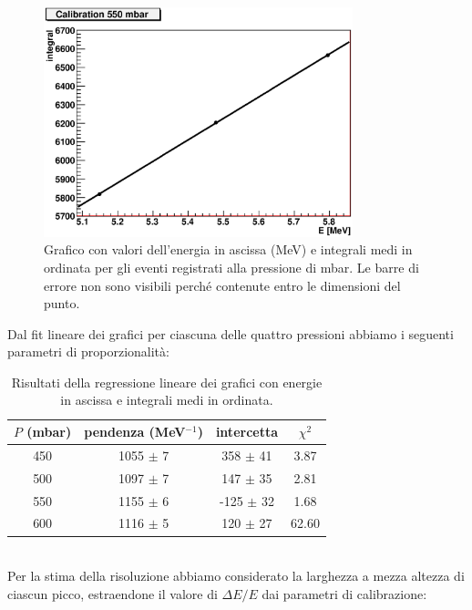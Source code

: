 \documentclass[italian,a4paper]{article}
\newcommand{\D}{\Delta}
\begin{document}
\begin{figure}[h!]\centering
\includegraphics[width=0.8\textwidth]{550_calib.eps}
\caption{Grafico con valori dell'energia in ascissa (MeV) e integrali medi in ordinata per gli eventi registrati alla pressione di \unit[550]{mbar}. Le barre di errore non sono visibili perch\'{e} contenute entro le dimensioni del punto.}
\label{calib}
\end{figure}
\clearpage
Dal fit lineare dei grafici per ciascuna delle quattro pressioni abbiamo i seguenti parametri di proporzionalit\`a:
\begin{table}[h!]\centering
\begin{tabular}{*4c}
$P$ (mbar)&		pendenza (MeV$^{-1}$)&	intercetta&   	$\chi^2$\\\hline
450&			1055 $\pm$ 7&		358 $\pm$ 41&	3.87\\
500&			1097 $\pm$ 7&		147 $\pm$ 35&	2.81\\
550&			1155 $\pm$ 6&		-125 $\pm$ 32&	1.68\\
600&			1116 $\pm$ 5&		120 $\pm$ 27&	62.60	
\end{tabular}
\caption{Risultati della regressione lineare dei grafici con energie in ascissa e integrali medi in ordinata.}
\end{table}\\
Per la stima della risoluzione abbiamo considerato la larghezza a mezza altezza di ciascun picco, estraendone il valore di $\D E / E$ dai parametri di calibrazione:
\end{document}
